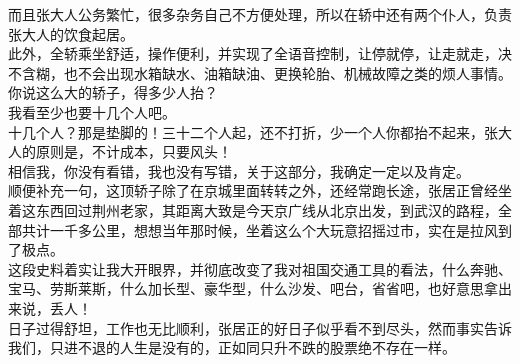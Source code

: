 \begin{multicols}{\theparacolNo}
而且张大人公务繁忙，很多杂务自己不方便处理，所以在轿中还有两个仆人，负责张大人的饮食起居。\\

此外，全轿乘坐舒适，操作便利，并实现了全语音控制，让停就停，让走就走，决不含糊，也不会出现水箱缺水、油箱缺油、更换轮胎、机械故障之类的烦人事情。\\

你说这么大的轿子，得多少人抬？\\

我看至少也要十几个人吧。\\

十几个人？那是垫脚的！三十二个人起，还不打折，少一个人你都抬不起来，张大人的原则是，不计成本，只要风头！\\

相信我，你没有看错，我也没有写错，关于这部分，我确定一定以及肯定。\\

顺便补充一句，这顶轿子除了在京城里面转转之外，还经常跑长途，张居正曾经坐着这东西回过荆州老家，其距离大致是今天京广线从北京出发，到武汉的路程，全部共计一千多公里，想想当年那时候，坐着这么个大玩意招摇过市，实在是拉风到了极点。\\

这段史料着实让我大开眼界，并彻底改变了我对祖国交通工具的看法，什么奔驰、宝马、劳斯莱斯，什么加长型、豪华型，什么沙发、吧台，省省吧，也好意思拿出来说，丢人！\\

日子过得舒坦，工作也无比顺利，张居正的好日子似乎看不到尽头，然而事实告诉我们，只进不退的人生是没有的，正如同只升不跌的股票绝不存在一样。\\
\ifnum{}
	\end{multicols}
\fi
\newpage

